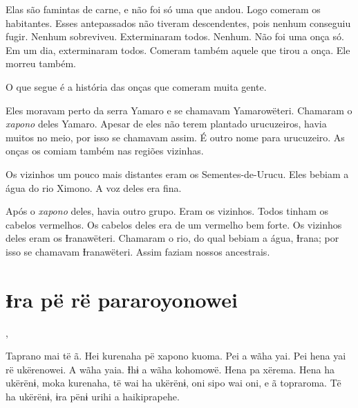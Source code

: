 Elas são famintas de carne, e não foi só uma que andou. Logo comeram os
habitantes. Esses antepassados não tiveram descendentes, pois nenhum
conseguiu fugir. Nenhum sobreviveu. Exterminaram todos. Nenhum. Não foi uma onça só. Em um dia, exterminaram todos. Comeram também aquele que tirou
a onça. Ele morreu também. 


O que segue é a história das onças que comeram muita gente. 

Eles moravam perto da serra Yamaro e se chamavam Yamarowëteri. Chamaram
o \textit{xapono} deles Yamaro. Apesar de eles não terem plantado urucuzeiros,
havia muitos no meio, por isso se chamavam assim. É outro nome para
urucuzeiro. As onças os comiam também nas regiões vizinhas. 

Os vizinhos um pouco mais distantes eram os Sementes-de-Urucu. Eles
bebiam a água do rio Ximono. A voz deles era fina. 

Após o \textit{xapono} deles, havia outro grupo. Eram os vizinhos. Todos tinham
os cabelos vermelhos. Os cabelos deles era de um vermelho bem forte. Os
vizinhos deles eram os Ɨranawëteri. Chamaram o rio, do qual bebiam a
água, Ɨrana; por isso se chamavam Ɨranawëteri. Assim faziam nossos
ancestrais.

\chapter{Ɨra pë rë pararoyonowei}
 
,  

Taprano mai të ã. Hei kurenaha pë xapono kuoma. Pei a wãha yai. Pei hena
yai rë ukërenowei. A wãha yaia. Ɨhɨ a wãha kohomowë. Hena pa xërema.
Hena ha ukërënɨ, moka kurenaha, të wai ha ukërënɨ, oni sipo wai oni, e ã
topraroma. Të ha ukërënɨ, ɨra pënɨ urihi a haikiprapehe. 


